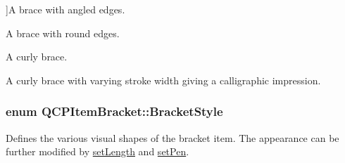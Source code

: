 \begin{Desc}
\begin{description}
{}]A brace with angled edges. \item[{\em 
bs\+Round\hypertarget{class_q_c_p_item_bracket_a7ac3afd0b24a607054e7212047d59dbdad2626a7b6509a484d6b7b3210be33966}{}\label{class_q_c_p_item_bracket_a7ac3afd0b24a607054e7212047d59dbdad2626a7b6509a484d6b7b3210be33966}
}]A brace with round edges. \item[{\em 
bs\+Curly\hypertarget{class_q_c_p_item_bracket_a7ac3afd0b24a607054e7212047d59dbda2f39852776671dab9ef24020d3b56660}{}\label{class_q_c_p_item_bracket_a7ac3afd0b24a607054e7212047d59dbda2f39852776671dab9ef24020d3b56660}
}]A curly brace. \item[{\em 
bs\+Calligraphic\hypertarget{class_q_c_p_item_bracket_a7ac3afd0b24a607054e7212047d59dbda0333e35b7183ca344f06435133ca53b5}{}\label{class_q_c_p_item_bracket_a7ac3afd0b24a607054e7212047d59dbda0333e35b7183ca344f06435133ca53b5}
}]A curly brace with varying stroke width giving a calligraphic impression. \end{description}
\end{Desc}
\subsubsection[{\texorpdfstring{Bracket\+Style}{BracketStyle}}]{\setlength{\rightskip}{0pt plus 5cm}enum {\bf Q\+C\+P\+Item\+Bracket\+::\+Bracket\+Style}}\hypertarget{class_q_c_p_item_bracket_a7ac3afd0b24a607054e7212047d59dbd}{}\label{class_q_c_p_item_bracket_a7ac3afd0b24a607054e7212047d59dbd}
Defines the various visual shapes of the bracket item. The appearance can be further modified by \hyperlink{class_q_c_p_item_bracket_ac7cfc3da7da9b5c5ac5dfbe4f0351b2a}{set\+Length} and \hyperlink{class_q_c_p_item_bracket_ab13001d9cc5d8f9e56ea15bdda682acb}{set\+Pen}.

